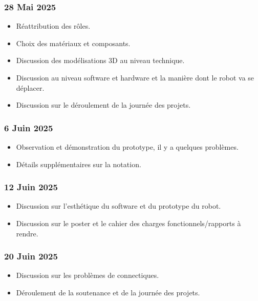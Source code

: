 \documentclass[a4paper,12pt]{report}  %
\begin{document}
\subsubsection{28 Mai 2025}
\begin{itemize}%
	\item Réattribution des rôles.
	\item Choix des matériaux et composants.
	\item Discussion des modélisations 3D au niveau technique.
	\item Discussion au niveau software et hardware et la manière dont le robot va se déplacer.
	\item Discussion sur le déroulement de la journée des projets.
\end{itemize}

\subsubsection{6 Juin 2025}
\begin{itemize}%
	\item Observation et démonstration du prototype, il y a quelques problèmes.
	\item Détails supplémentaires sur la notation.
\end{itemize}

\subsubsection{12 Juin 2025}
\begin{itemize}%
	\item Discussion sur l’esthétique du software et du prototype du robot.
	\item Discussion sur le poster et le cahier des charges fonctionnels/rapports à rendre.
\end{itemize}

\subsubsection{20 Juin 2025}
\begin{itemize}%
	\item Discussion sur les problèmes de connectiques.
	\item Déroulement de la soutenance et de la journée des projets.
\end{itemize}


\end{document}
